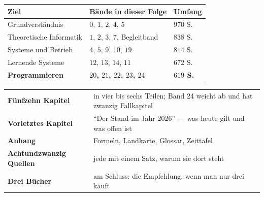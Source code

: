 \begin{technik}
\begin{center}
{\small
\renewcommand{\arraystretch}{1.5}
\begin{tabular}{@{}P{3.0cm}P{4.2cm}P{1.6cm}@{}}
\toprule
\textbf{Ziel} & \textbf{Bände in dieser Folge} & \textbf{Umfang}\\
\midrule
Grund\-verständnis & $0$, $1$, $2$, $4$, $5$ & $970$ S.\\
Theoretische Informatik & $1$, $2$, $3$, $7$, Begleitband & $838$ S.\\
Systeme und Betrieb & $4$, $5$, $9$, $10$, $19$ & $814$ S.\\
Lernende Systeme & $12$, $13$, $14$, $11$ & $672$ S.\\
\textbf{Programmieren} & \textbf{$20$, $21$, $22$, $23$, $24$} & \textbf{$619$ S.}\\
\bottomrule
\end{tabular}}
\end{center}

\begin{center}
\begin{minipage}{0.88\textwidth}
\end{minipage}
\end{center}
\end{technik}

\begin{merksatz}
\begin{center}
\renewcommand{\arraystretch}{1.5}
\begin{tabular}{@{}P{3.0cm}P{6.0cm}@{}}
\toprule
\textbf{Fünfzehn Kapitel} & in vier bis sechs Teilen; Band 24 weicht ab und hat zwanzig Fallkapitel\\
\textbf{Vorletztes Kapitel} & \enquote{Der Stand im Jahr 2026} --- was heute gilt und was offen ist\\
\textbf{Anhang} & Formeln, Landkarte, Glossar, Zeittafel\\
\textbf{Achtundzwanzig Quellen} & jede mit einem Satz, warum sie dort steht\\
\textbf{Drei Bücher} & am Schluss: die Empfehlung, wenn man nur drei kauft\\
\bottomrule
\end{tabular}
\end{center}
\end{merksatz}
